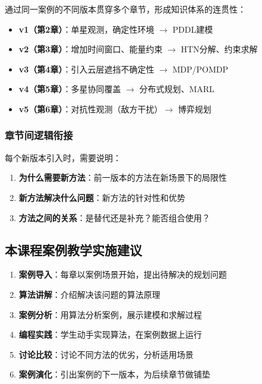 \documentclass[12pt,a4paper]{ctexart}
\begin{document}
通过同一案例的不同版本贯穿多个章节，形成知识体系的连贯性：

\begin{casebox}
\begin{itemize}[leftmargin=2em]
    \item \textbf{v1（第2章）}：单星观测，确定性环境 $\rightarrow$ PDDL建模
    \item \textbf{v2（第3章）}：增加时间窗口、能量约束 $\rightarrow$ HTN分解、约束求解
    \item \textbf{v3（第4章）}：引入云层遮挡不确定性 $\rightarrow$ MDP/POMDP
    \item \textbf{v4（第5章）}：多星协同覆盖 $\rightarrow$ 分布式规划、MARL
    \item \textbf{v5（第6章）}：对抗性观测（敌方干扰）$\rightarrow$ 博弈规划
\end{itemize}
\end{casebox}

\subsubsection{章节间逻辑衔接}

每个新版本引入时，需要说明：
\begin{enumerate}[leftmargin=2em]
    \item \textbf{为什么需要新方法}：前一版本的方法在新场景下的局限性
    \item \textbf{新方法解决什么问题}：新方法的针对性和优势
    \item \textbf{方法之间的关系}：是替代还是补充？能否组合使用？
\end{enumerate}

\subsection{本课程案例教学实施建议}

\begin{methodbox}[任务规划课程案例教学实施建议]
\begin{enumerate}[leftmargin=2em]
    \item \textbf{案例导入}：每章以案例场景开始，提出待解决的规划问题
    \item \textbf{算法讲解}：介绍解决该问题的算法原理
    \item \textbf{案例分析}：用算法分析案例，展示建模和求解过程
    \item \textbf{编程实践}：学生动手实现算法，在案例数据上运行
    \item \textbf{讨论比较}：讨论不同方法的优劣，分析适用场景
    \item \textbf{案例演化}：引出案例的下一版本，为后续章节做铺垫
\end{enumerate}
\end{methodbox}
\end{document}

